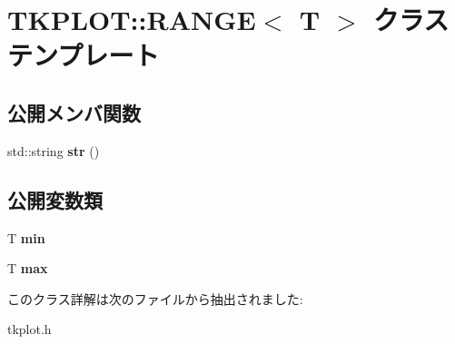 \hypertarget{class_t_k_p_l_o_t_1_1_r_a_n_g_e}{}\section{T\+K\+P\+L\+OT\+:\+:R\+A\+N\+GE$<$ T $>$ クラステンプレート}
\label{class_t_k_p_l_o_t_1_1_r_a_n_g_e}
\subsection*{公開メンバ関数}
\begin{DoxyCompactItemize}
\item 
\mbox{\label{class_t_k_p_l_o_t_1_1_r_a_n_g_e_aada3563138773d6575a67eed99dc8c1b}} 
std\+::string {\bfseries str} ()
\end{DoxyCompactItemize}
\subsection*{公開変数類}
\begin{DoxyCompactItemize}
\item 
\mbox{\label{class_t_k_p_l_o_t_1_1_r_a_n_g_e_af83dec2420b2e2d8629d212475a49fee}} 
T {\bfseries min}
\item 
\mbox{\label{class_t_k_p_l_o_t_1_1_r_a_n_g_e_a7100fa300f2cffeed4e5f0657afea787}} 
T {\bfseries max}
\end{DoxyCompactItemize}


このクラス詳解は次のファイルから抽出されました\+:\begin{DoxyCompactItemize}
\item 
tkplot.\+h\end{DoxyCompactItemize}

